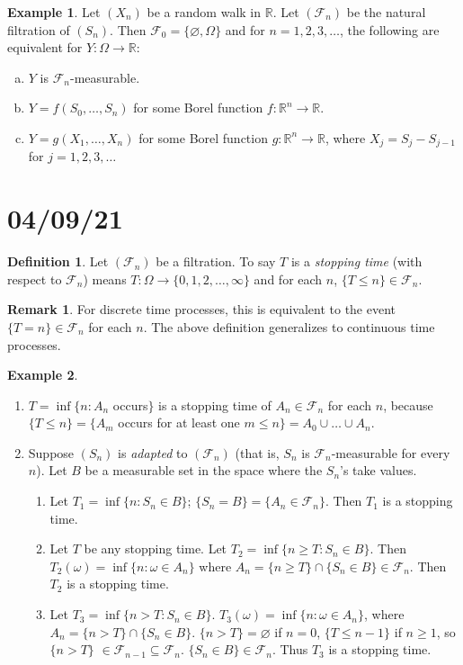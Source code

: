 \documentclass{article}
\newcommand{\R}{\mathbb{R}}
\newcommand{\F}{\mathscr{F}}
\theoremstyle{definition}
\newtheorem*{example}{Example}
\newtheorem*{definition}{Definition}
\newtheorem*{remark}{Remark}
\begin{document}
\begin{example}
Let $(X_n)$ be a random walk in $\R$. Let $(\F_n)$ be the natural filtration of $(S_n)$. Then $\F_0 = \{\varnothing, \Omega\}$ and for $n = 1, 2, 3, \dots$, the following are equivalent for $Y : \Omega \to \R$:
\begin{enumerate}[(a)]
    \item $Y$ is $\F_n$-measurable.
    \item $Y = f(S_0, \dots, S_n)$ for some Borel function $f : \R^n \to \R$.
    \item $Y = g(X_1, \dots, X_n)$ for some Borel function $g : \R^n \to \R$, where $X_j = S_j - S_{j-1}$ for $j = 1, 2, 3, \dots$
\end{enumerate}
\end{example}

\section*{04/09/21}

\begin{definition}
Let $(\F_n)$ be a filtration. To say $T$ is a \emph{stopping time} (with respect to $\F_n$) means $T : \Omega \to \{0, 1, 2, \dots, \infty\}$ and for each $n$, $\{T \leq n\} \in \F_n$.
\end{definition}
\begin{remark}
For discrete time processes, this is equivalent to the event $\{T = n\} \in \F_n$ for each $n$. The above definition generalizes to continuous time processes.
\end{remark}
\begin{example}
\begin{enumerate}
    \item $T = \inf\{n : A_n$ occurs$\}$ is a stopping time of $A_n \in \F_n$ for each $n$, because $\{T \leq n\} = \{A_m$ occurs for at least one $m \leq n\} = A_0 \cup \dots \cup A_n$.
    \item Suppose $(S_n)$ is \emph{adapted} to $(\F_n)$ (that is, $S_n$ is $\F_n$-measurable for every $n$). Let $B$ be a measurable set in the space where the $S_n$'s take values.
    \begin{enumerate}
        \item Let $T_1 = \inf\{n : S_n \in B\}$; $\{S_n = B\} = \{A_n \in \F_n\}$. Then $T_1$ is a stopping time.
        \item Let $T$ be any stopping time. Let $T_2 = \inf\{n \geq T : S_n \in B\}$. Then $T_2(\omega) = \inf\{n : \omega \in A_n\}$ where $A_n = \{n \geq T\} \cap \{S_n \in B\} \in \F_n$. Then $T_2$ is a stopping time.
        \item Let $T_3 = \inf\{n > T : S_n \in B\}$. $T_3(\omega) = \inf\{n : \omega \in A_n\}$, where $A_n = \{n > T\} \cap \{S_n \in B\}$. $\{n > T\} = \varnothing$ if $n = 0$, $\{T \leq n-1\}$ if $n \geq 1$, so $\{n > T\}$ $\in \F_{n-1} \subseteq \F_n$. $\{S_n \in B\} \in \F_n$. Thus $T_3$ is a stopping time.
    \end{enumerate}
\end{enumerate}
\end{example}
\end{document}
